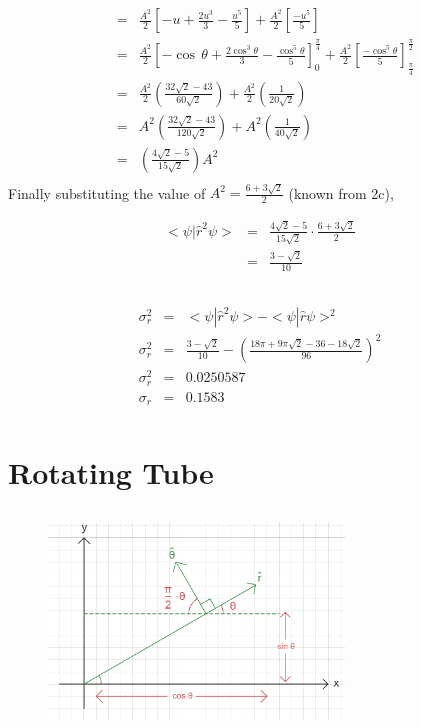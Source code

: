 \documentclass{article}
\begin{document}
{\begin{eqnarray*}
        &=&\frac{A^2 }{2} [-u + \frac{2u^3}{3} - \frac{u^5}{5}] +\frac{A^2 }{2} [\frac{-u^5}{5}] \\
        &=&\frac{A^2 }{2} [-\cos\,\theta + \frac{2\cos^3\theta}{3} - \frac{\cos^5\theta}{5}]_{0}^{\frac{\pi}{4}} +\frac{A^2 }{2} [\frac{-\cos^5\theta}{5}]_{\frac{\pi}{4}}^{\frac{\pi}{2}} \\
        &=&\frac{A^2 }{2} (\frac{32\sqrt{2}-43}{60\sqrt{2}}) +\frac{A^2 }{2} (\frac{1}{20\sqrt{2}}) \\
        &=& A^2 (\frac{32\sqrt{2}-43}{120\sqrt{2}}) +A^2 (\frac{1}{40\sqrt{2}}) \\
        &=& (\frac{4\sqrt{2}-5}{15\sqrt{2}})A^2 \\
\end{eqnarray*}
Finally substituting the value of $A^2 = \frac{6+3\sqrt{2}}{2}$ (known from 2c),

\begin{eqnarray*}
        <\psi|\hat{r}^2\psi> &=& \frac{4\sqrt{2}-5}{15\sqrt{2}} \cdot \frac{6+3\sqrt{2}}{2}\\
        &=&\frac{3-\sqrt{2}}{10}
\end{eqnarray*}
}

\vspace{2cm}
\subsection{}%
{\large
\begin{eqnarray*}
    \sigma_r^2 &=&<\psi|\hat{r}^2\psi> - <\psi|\hat{r}\psi> ^2\\
    \sigma_r^2 &=&\frac{3-\sqrt{2}}{10} - (\frac{18\pi + 9\pi\sqrt{2} -36 - 18 \sqrt{2}}{96})^2\\
    \sigma_r^2 &=& 0.0250587\\
    \sigma_r &=& 0.1583\\
\end{eqnarray*}
}



\newpage
\section{Rotating Tube}

\subsection{}%
\setcounter{equation}{0}
\begin{figure}[h]
    \centering
    \includegraphics[width=0.7\textwidth]{3-a.PNG}
\end{figure}
\end{document}
